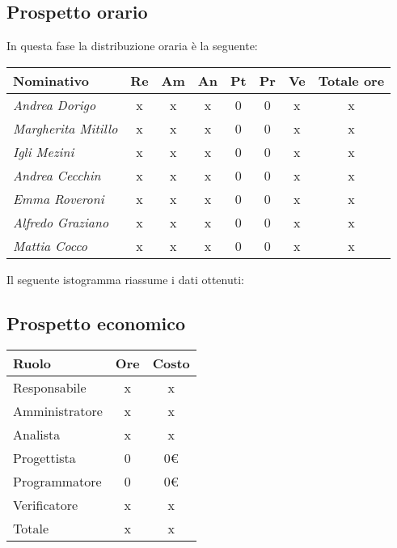 \subsection{Prospetto orario}\label{5.1.1}
In questa fase la distribuzione oraria è la seguente:
\quad
\def\tabularxcolumn#1{m{#1}}
{
	
	\begin{center}
		\renewcommand{\arraystretch}{1.4}
		\begin{tabularx}{\textwidth}{|X|c|c|c|c|c|c|c|}
			\hline
			\rowcolor{airforceblue}
			\textbf{Nominativo} & \textbf{Re} & \textbf{Am} & \textbf{An} & \textbf{Pt} & \textbf{Pr} & \textbf{Ve} & \textbf{Totale ore}\\
			\hline
			\textit{Andrea Dorigo} & x & x & x & 0 & 0 & x & x\\
			\hline
			\textit{Margherita Mitillo} & x & x & x & 0 & 0 & x & x\\
			\hline
			\textit{Igli Mezini} & x & x & x & 0 & 0 & x & x\\
			\hline
			\textit{Andrea Cecchin} & x & x & x & 0 & 0 & x & x\\
			\hline
			\textit{Emma Roveroni} & x & x & x & 0 & 0 & x & x\\
			\hline
			\textit{Alfredo Graziano} & x & x & x & 0 & 0 & x & x\\
			\hline
			\textit{Mattia Cocco} & x & x & x & 0 & 0 & x & x\\
			\hline
		\end{tabularx}
	\end{center}

Il seguente istogramma riassume i dati ottenuti:

\subsection{Prospetto economico}\label{5.1.2}
\quad
\def\tabularxcolumn#1{m{#1}}
{	
	\begin{center}
		\renewcommand{\arraystretch}{1.4}
		\begin{tabularx}{7cm}{|X|c|c|}
			\hline
			\rowcolor{airforceblue}
			\textbf{Ruolo} & \textbf{Ore} & \textbf{Costo}\\
			\hline
			Responsabile & x & x\\
			\hline
			Amministratore & x & x\\
			\hline
			Analista & x & x\\
			\hline
			Progettista & 0 & 0\euro\\
			\hline
			Programmatore & 0 & 0\euro\\
			\hline
			Verificatore & x & x\\
			\hline
			Totale & x & x\\
			\hline
		\end{tabularx}
	\end{center}

}}
